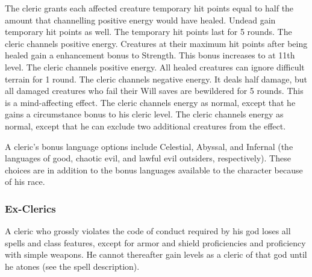 The cleric grants each affected creature temporary hit points equal to half the amount that channelling positive energy would have healed. Undead gain temporary hit points as well. The temporary hit points last for 5 rounds.
 The cleric channels positive energy. Creatures at their maximum hit points after being healed gain a  enhancement bonus to Strength. This bonus increases to  at 11th level.
 The cleric channels positive energy. All healed creatures can ignore difficult terrain for 1 round.
 The cleric channels negative energy. It deals half damage, but all damaged creatures who fail their Will saves are bewildered for 5 rounds. This is a mind-affecting effect.
 The cleric channels energy as normal, except that he gains a  circumstance bonus to his cleric level.
 The cleric channels energy as normal, except that he can exclude two additional creatures from the effect.

 A cleric's bonus language options include
Celestial, Abyssal, and Infernal (the languages of good, chaotic evil,
and lawful evil outsiders, respectively). These choices are in addition to the bonus languages available to the character because of his race.

\subsubsection{Ex-Clerics}
A cleric who grossly violates the code of conduct required by his god loses all spells and class features, except for armor and shield proficiencies and proficiency with simple weapons. He cannot thereafter gain levels as a cleric of that god until he atones (see the  spell description).

